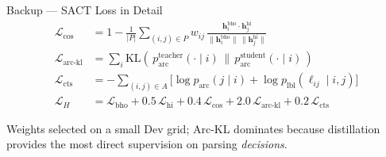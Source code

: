 \documentclass[aspectratio=169,10pt]{beamer}
\begin{document}
\begin{frame}{Backup --- SACT Loss in Detail}
\begin{align*}
\mathcal{L}_{\text{cos}} &= 1 - \frac{1}{|P|}\sum_{(i,j)\in P} w_{ij}\,\frac{\mathbf{h}^{\text{bho}}_i \cdot \mathbf{h}^{\text{hi}}_j}{\|\mathbf{h}^{\text{bho}}_i\|\,\|\mathbf{h}^{\text{hi}}_j\|} \\[4pt]
\mathcal{L}_{\text{arc-kl}} &= \sum_i \mathrm{KL}\!\left(\,p^{\text{teacher}}_{\text{arc}}(\cdot\mid i)\,\|\,p^{\text{student}}_{\text{arc}}(\cdot\mid i)\,\right) \\[4pt]
\mathcal{L}_{\text{cts}}    &= -\sum_{(i,j)\in A}\bigl[\log p_{\text{arc}}(j\mid i) + \log p_{\text{lbl}}(\ell_{ij}\mid i,j)\bigr] \\[6pt]
\mathcal{L}_H &= \mathcal{L}_{\text{bho}} + 0.5\,\mathcal{L}_{\text{hi}} + 0.4\,\mathcal{L}_{\text{cos}} + 2.0\,\mathcal{L}_{\text{arc-kl}} + 0.2\,\mathcal{L}_{\text{cts}}
\end{align*}

\vspace{0.2cm}
Weights selected on a small Dev grid; Arc-KL dominates because distillation provides
the most direct supervision on parsing \emph{decisions}.
\end{frame}
\end{document}
